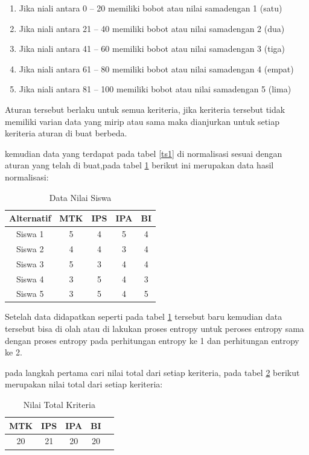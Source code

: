 \begin{enumerate}
\item Jika niali antara 0 – 20 memiliki bobot atau nilai samadengan 1 (satu)
\item Jika niali antara 21 – 40 memiliki bobot atau nilai samadengan 2 (dua)
\item Jika niali antara 41 – 60 memiliki bobot atau nilai samadengan  3 (tiga)
\item Jika niali antara 61 – 80 memiliki bobot atau nilai samadengan 4 (empat)
\item Jika niali antara 81 – 100 memiliki bobot atau nilai samadengan 5 (lima)
\end{enumerate}
\pagebreak
	Aturan tersebut berlaku untuk semua keriteria, jika keriteria tersebut tidak memiliki varian data yang mirip atau sama maka dianjurkan untuk setiap keriteria aturan di buat berbeda.\par

kemudian data yang terdapat pada tabel \ref{ts1} di normalisasi sesuai dengan aturan yang telah di buat,pada tabel \ref{ts2} berikut ini merupakan data hasil normalisasi:

\begin{table}[h]
\caption{Data Nilai Siswa}
\centering
\begin{tabular}{|c|c|c|c|c|}
\hline
Alternatif & MTK & IPS & IPA&BI\\
\hline
Siswa 1 &5 & 4 & 5 &  4\\
\hline
Siswa 2 &4 & 4 & 3 &  4\\
\hline
Siswa 3 &5 & 3 & 4 &  4\\
\hline
Siswa 4 &3 & 5 & 4 &  3\\
\hline
Siswa 5 &3 & 5 & 4 &  5\\
\hline
\end{tabular}
\label{ts2}
\end{table}

Setelah data didapatkan seperti pada tabel \ref{ts2} tersebut baru kemudian data tersebut bisa di olah atau di lakukan proses entropy untuk peroses entropy sama dengan proses entropy pada perhitungan entropy  ke 1 dan perhitungan entropy ke 2.

pada langkah pertama cari nilai total dari setiap keriteria, pada tabel \ref{ts3} berikut merupakan nilai total dari setiap keriteria:

\begin{table}[h]
\caption{Nilai Total Kriteria}
\centering
\begin{tabular}{|c|c|c|c|c|}
\hline
 MTK & IPS & IPA&BI\\
\hline
20 & 21 & 20 &  20\\
\hline
\end{tabular}
\label{ts3}
\end{table}

